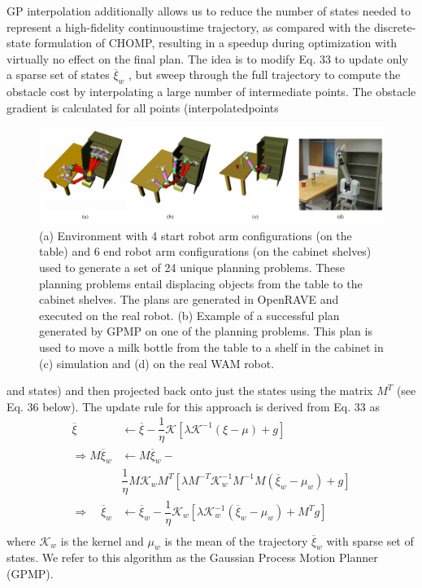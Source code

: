 \documentclass{IEEEtran}
\begin{document}
GP interpolation additionally allows us to reduce the number of states needed to represent a high-fidelity continuoustime trajectory, as compared with the discrete-state formulation of CHOMP, resulting in a speedup during optimization
with virtually no effect on the final plan. The idea is to
modify Eq. 33 to update only a sparse set of states $\overline{\xi}_w$ , but
sweep through the full trajectory to compute the obstacle
cost by interpolating a large number of intermediate points.
The obstacle gradient is calculated for all points (interpolatedpoints 
\begin{figure}[htp]
\centering
\includegraphics[scale=0.3]{论文1}

\caption{(a) Environment with 4 start robot arm configurations (on the table) and 6 end robot arm configurations (on the
cabinet shelves) used to generate a set of 24 unique planning problems. These planning problems entail displacing objects
from the table to the cabinet shelves. The plans are generated in OpenRAVE and executed on the real robot. (b) Example
of a successful plan generated by GPMP on one of the planning problems. This plan is used to move a milk bottle from
the table to a shelf in the cabinet in (c) simulation and (d) on the real WAM robot.}
\end{figure}
and states) and then projected back onto just the states
using the matrix $M^T$
(see Eq. 36 below). The update rule
for this approach is derived from Eq. 33 as
\begin{align*}
\overline{\xi}&\leftarrow\overline{\xi}-\dfrac{1}{\eta}\mathcal{K}[\lambda\mathcal{K}^{-1}(\xi-\mu)+g]\\
\Longrightarrow M\overline{\xi}_w&\leftarrow M\overline{\xi}_w-\\
&\dfrac{1}{\eta}M\mathcal{K}_wM^T[\lambda M^{-T}\mathcal{K}_w^{-1}M^{-1}M(\overline{\xi}_w-\mu_w)+g]\\
\Longrightarrow\quad\overline{\xi}_w&\leftarrow\overline{\xi}_w-\dfrac{1}{\eta}\mathcal{K}_w[\lambda\mathcal{K}_w^{-1}(\overline{\xi}_w-\mu_w)+M^Tg]\\
\tag{36}
\end{align*}
where $\mathcal{K}_w$ is the kernel and $\mu_w$ is the mean of the trajectory
$\overline{\xi}_w$ with sparse set of states. We refer to this algorithm as
the Gaussian Process Motion Planner (GPMP).
\end{document}
